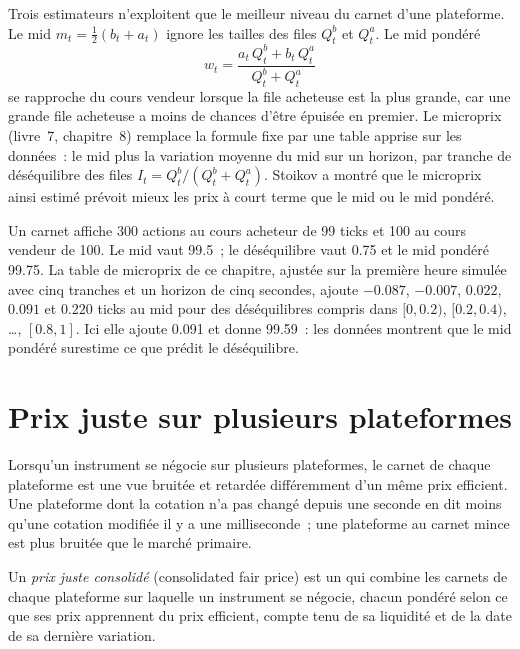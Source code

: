 Trois estimateurs n'exploitent que le meilleur niveau du carnet d'une plateforme. Le mid $m_t=\tfrac12(b_t+a_t)$ ignore les tailles des files $Q^b_t$ et $Q^a_t$. Le mid pondéré
\[
w_t=\frac{a_t\,Q^b_t+b_t\,Q^a_t}{Q^b_t+Q^a_t}
\]
se rapproche du cours vendeur lorsque la file acheteuse est la plus grande, car une grande file acheteuse a moins de chances d'être épuisée en premier. Le microprix (livre~7,
chapitre~8) remplace la formule fixe par une table apprise sur les données~: le mid plus la variation moyenne du mid sur un horizon, par
tranche de déséquilibre des files $I_t=Q^b_t/(Q^b_t+Q^a_t)$. Stoikov a montré que le microprix ainsi estimé prévoit mieux les prix à court terme que le
mid ou le mid pondéré.

\begin{example}\label{ex:hf:fair-value:three}
Un carnet affiche 300 actions au cours acheteur de 99 ticks et 100 au cours vendeur de 100. Le mid vaut 99.5~; le déséquilibre vaut 0.75 et le mid pondéré 99.75. La
table de microprix de ce chapitre, ajustée sur la première heure simulée avec cinq tranches et un horizon de cinq secondes, ajoute $-0.087$, $-0.007$, $0.022$, $0.091$ et
$0.220$ ticks au mid pour des déséquilibres compris dans $[0,0.2)$, $[0.2,0.4)$, \dots, $[0.8,1]$. Ici elle ajoute 0.091 et donne 99.59~: les données montrent que le mid pondéré
surestime ce que prédit le déséquilibre.
\end{example}

\section{Prix juste sur plusieurs plateformes}

Lorsqu'un instrument se négocie sur plusieurs plateformes, le carnet de chaque plateforme est une vue bruitée et retardée différemment d'un même prix efficient. Une plateforme dont la cotation
n'a pas changé depuis une seconde en dit moins qu'une cotation modifiée il y a une milliseconde~; une plateforme au carnet mince est plus bruitée que le marché primaire.

\begin{definition}\label{def:hf:fair-value:consolidated}
Un \emph{prix juste consolidé} (consolidated fair price) est un  qui combine les carnets de chaque plateforme sur laquelle un instrument
se négocie, chacun pondéré selon ce que ses prix apprennent du prix efficient, compte tenu de sa liquidité et de la date de sa dernière variation.
\end{definition}

